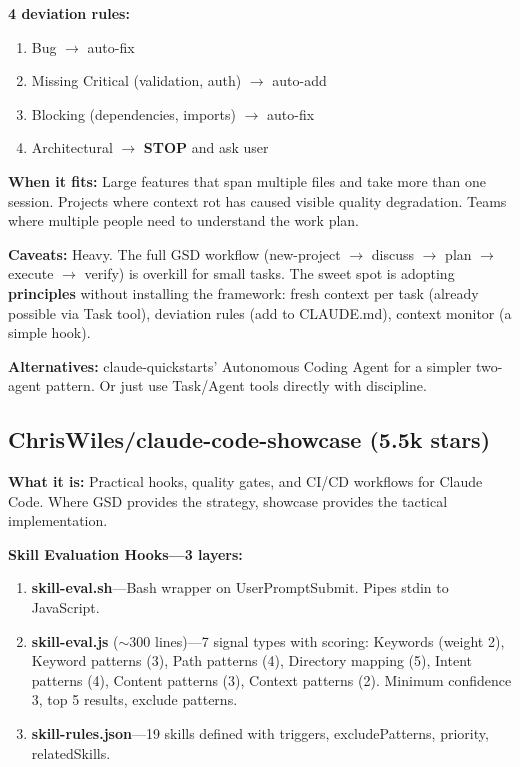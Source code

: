\documentclass[11pt,a4paper]{article}
\begin{document}
\textbf{4 deviation rules:}
\begin{enumerate}
  \item Bug $\rightarrow$ auto-fix
  \item Missing Critical (validation, auth) $\rightarrow$ auto-add
  \item Blocking (dependencies, imports) $\rightarrow$ auto-fix
  \item Architectural $\rightarrow$ \textbf{STOP} and ask user
\end{enumerate}

\textbf{When it fits:} Large features that span multiple files and take more than one session. Projects where context rot has caused visible quality degradation. Teams where multiple people need to understand the work plan.

\textbf{Caveats:} Heavy. The full GSD workflow (new-project $\rightarrow$ discuss $\rightarrow$ plan $\rightarrow$ execute $\rightarrow$ verify) is overkill for small tasks. The sweet spot is adopting \textbf{principles} without installing the framework: fresh context per task (already possible via Task tool), deviation rules (add to CLAUDE.md), context monitor (a simple hook).

\textbf{Alternatives:} claude-quickstarts' Autonomous Coding Agent for a simpler two-agent pattern. Or just use Task/Agent tools directly with discipline.

\subsection{ChrisWiles/claude-code-showcase (5.5k stars)}

\textbf{What it is:} Practical hooks, quality gates, and CI/CD workflows for Claude Code. Where GSD provides the strategy, showcase provides the tactical implementation.

\textbf{Skill Evaluation Hooks---3 layers:}

\begin{enumerate}
  \item \textbf{skill-eval.sh}---Bash wrapper on UserPromptSubmit. Pipes stdin to JavaScript.
  \item \textbf{skill-eval.js} ($\sim$300 lines)---7 signal types with scoring: Keywords (weight 2), Keyword patterns (3), Path patterns (4), Directory mapping (5), Intent patterns (4), Content patterns (3), Context patterns (2). Minimum confidence 3, top 5 results, exclude patterns.
  \item \textbf{skill-rules.json}---19 skills defined with triggers, excludePatterns, priority, relatedSkills.
\end{enumerate}
\end{document}
